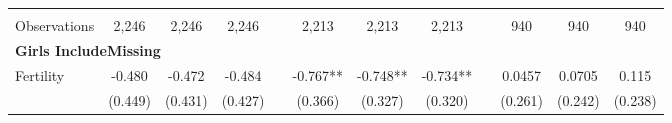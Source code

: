 \begin{landscape}
\begin{table}[htpb!]
\begin{center}
\begin{tabular}{lcccp{2mm}cccp{2mm}ccc}
\begin{footnotesize}\end{footnotesize}&\begin{footnotesize}\end{footnotesize}&\begin{footnotesize}\end{footnotesize}&\begin{footnotesize}\end{footnotesize}&\begin{footnotesize}\end{footnotesize}&\begin{footnotesize}\end{footnotesize}&\begin{footnotesize}\end{footnotesize}&\begin{footnotesize}\end{footnotesize}&\begin{footnotesize}\end{footnotesize}&\begin{footnotesize}\end{footnotesize}&\begin{footnotesize}\end{footnotesize}&\begin{footnotesize}\end{footnotesize}\\Observations&2,246&2,246&2,246&&2,213&2,213&2,213&&940&940&940\\
\multicolumn{12}{l}{\textbf{Girls IncludeMissing}}\\ 
Fertility&-0.480&-0.472&-0.484&&-0.767**&-0.748**&-0.734**&&0.0457&0.0705&0.115\\
&(0.449)&(0.431)&(0.427)&&(0.366)&(0.327)&(0.320)&&(0.261)&(0.242)&(0.238)\\

\end{tabular}
\end{center}
\end{table}
\end{landscape}
